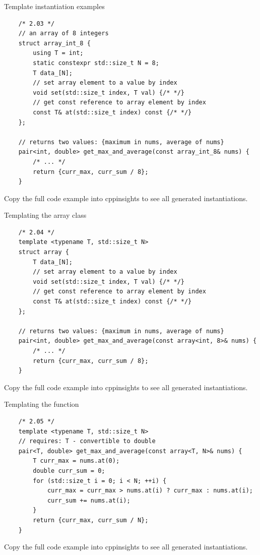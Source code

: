 \begin{frame}[fragile]{Template instantiation examples}
  \begin{verbatim}
    /* 2.03 */
    // an array of 8 integers
    struct array_int_8 {
        using T = int;
        static constexpr std::size_t N = 8;
        T data_[N];
        // set array element to a value by index
        void set(std::size_t index, T val) {/* */}
        // get const reference to array element by index
        const T& at(std::size_t index) const {/* */}
    };

    // returns two values: {maximum in nums, average of nums}
    pair<int, double> get_max_and_average(const array_int_8& nums) {
        /* ... */
        return {curr_max, curr_sum / 8};
    }
  \end{verbatim}

  Copy the full code example into cppinsights to see all generated instantiations.
\end{frame}

\begin{frame}[fragile]{Templating the array class}
  \begin{verbatim}
    /* 2.04 */
    template <typename T, std::size_t N>
    struct array {
        T data_[N];
        // set array element to a value by index
        void set(std::size_t index, T val) {/* */}
        // get const reference to array element by index
        const T& at(std::size_t index) const {/* */}
    };

    // returns two values: {maximum in nums, average of nums}
    pair<int, double> get_max_and_average(const array<int, 8>& nums) {
        /* ... */
        return {curr_max, curr_sum / 8};
    }
  \end{verbatim}

  Copy the full code example into cppinsights to see all generated instantiations.
\end{frame}

\begin{frame}[fragile]{Templating the function}
  \begin{verbatim}
    /* 2.05 */
    template <typename T, std::size_t N>
    // requires: T - convertible to double
    pair<T, double> get_max_and_average(const array<T, N>& nums) {
        T curr_max = nums.at(0);
        double curr_sum = 0;
        for (std::size_t i = 0; i < N; ++i) {
            curr_max = curr_max > nums.at(i) ? curr_max : nums.at(i);
            curr_sum += nums.at(i);
        }
        return {curr_max, curr_sum / N};
    }
  \end{verbatim}

  Copy the full code example into cppinsights to see all generated instantiations.
\end{frame}


